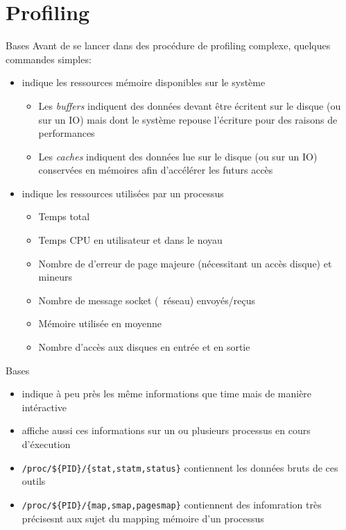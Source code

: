 \section{Profiling}

\begin{frame}[fragile=singleslide]{Bases}
  Avant  de  se  lancer  dans  des procédure  de  profiling  complexe,
  quelques commandes simples:
  \begin{itemize} 
  \item {}  indique les ressources mémoire  disponibles sur le
    système
    \begin{itemize}
    \item  Les  \emph{buffers}   indiquent  des  données  devant  être
      écritent  sur le  disque (ou  sur un  IO) mais  dont  le système
      repouse l'écriture pour des raisons de performances
    \item Les  \emph{caches} indiquent des  données lue sur  le disque
      (ou  sur un  IO)  conservées en  mémoires  afin d'accélérer  les
      futurs accès
    \end{itemize}
  \item {} indique les ressources utilisées par un processus
    \begin{itemize}
    \item Temps total
    \item Temps CPU en utilisateur et dans le noyau
    \item  Nombre de d'erreur  de page  majeure (nécessitant  un accès
      disque) et mineurs
    \item Nombre de message socket (~réseau) envoyés/reçus
    \item Mémoire utilisée en moyenne
    \item Nombre d'accès aux disques en entrée et en sortie
    \end{itemize} 
  \end{itemize}
\end{frame}

\begin{frame}[fragile=singleslide]{Bases}
  \begin{itemize} 
  \item {}  indique à peu  près les même informations  que time
    mais de manière intéractive
  \item {}  affiche aussi ces  informations sur un  ou plusieurs
    processus en cours d'éxecution
  \item    \verb+/proc/${PID}/{stat,statm,status}+   contiennent   les
    données bruts de ces outils
  \item    \verb+/proc/${PID}/{map,smap,pagesmap}+   contiennent   des
    infomration  très précisesnt  aux  sujet du  mapping mémoire  d'un
    processus
  \end{itemize}
\end{frame}


